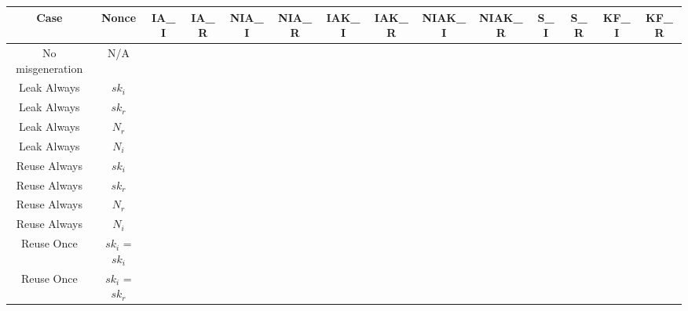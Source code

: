 \documentclass[crop]{standalone}
\newcommand{\noattack}{\color{ForestGreen}\usym{2713}\color{black}}
\newcommand{\attack}{\color{red}\usym{2717}\color{black}}
\begin{document}
\parbox{30cm}{
\begin{tabular}{|c|c|c|c|c|c|c|c|c|c|c|c|c|c|}
\hline
Case & Nonce & IA\_I & IA\_R & NIA\_I & NIA\_R & IAK\_I & IAK\_R & NIAK\_I & NIAK\_R & S\_I & S\_R & KF\_I & KF\_R \\ \hline
No misgeneration & N/A & \noattack & \noattack & \noattack & \noattack & \noattack & \noattack & \noattack & \noattack & \noattack & \noattack & \noattack & \noattack\\ \hline
Leak Always & $sk_i$ & \attack & \attack & \attack & \attack & \attack & \attack & \attack & \attack & \attack & \attack & \noattack & \noattack\\ \hline
Leak Always & $sk_r$ & \attack & \attack & \attack & \attack & \attack & \attack & \attack & \attack & \attack & \attack & \noattack & \noattack\\ \hline
Leak Always & $N_r$ & \attack & \attack & \attack & \attack & \attack & \attack & \attack & \attack & \attack & \attack & \noattack & \noattack\\ \hline
Leak Always & $N_i$ & \attack & \attack & \attack & \attack & \attack & \attack & \attack & \attack & \attack & \attack & \noattack & \noattack\\ \hline
Reuse Always & $sk_i$ & \noattack & \noattack & \noattack & \noattack & \noattack & \noattack & \noattack & \noattack & \noattack & \noattack & \noattack & \noattack\\ \hline
Reuse Always & $sk_r$ & \noattack & \noattack & \noattack & \noattack & \noattack & \noattack & \noattack & \noattack & \noattack & \noattack & \noattack & \noattack\\ \hline
Reuse Always & $N_r$ & \attack & \attack & \attack & \attack & \attack & \attack & \attack & \attack & \attack & \attack & \noattack & \noattack\\ \hline
Reuse Always & $N_i$ & \attack & \attack & \attack & \attack & \attack & \attack & \attack & \attack & \attack & \attack & \noattack & \noattack\\ \hline
Reuse Once & $sk_i$ = $sk_i$ & \noattack & \noattack & \noattack & \noattack & \noattack & \noattack & \noattack & \noattack & \noattack & \noattack & \noattack & \noattack\\ \hline
Reuse Once & $sk_i$ = $sk_r$ & \noattack & \noattack & \noattack & \noattack & \noattack & \noattack & \noattack & \noattack & \noattack & \noattack & \noattack & \noattack\\ \hline

\end{tabular}}
\end{document}
